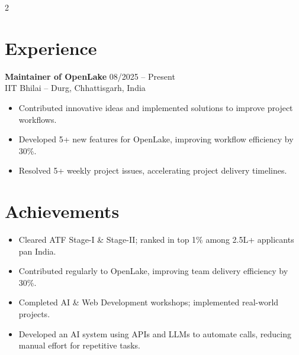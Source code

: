 \documentclass[a4paper,11pt]{article}
\begin{document}
\begin{paracol}{2}
		\section*{Experience}
		\textbf{Maintainer of OpenLake} \hfill 08/2025 -- Present\\
		IIT Bhilai – Durg, Chhattisgarh, India
		\begin{itemize}
			\item Contributed innovative ideas and implemented solutions to improve project workflows.
			\item Developed 5+ new features for OpenLake, improving workflow efficiency by 30\%.  
			\item Resolved 5+ weekly project issues, accelerating project delivery timelines. 
		\end{itemize}
		
		\section*{Achievements}
		\begin{itemize}
			\item Cleared ATF Stage-I \& Stage-II; ranked in top 1\% among 2.5L+ applicants pan India.
			\item Contributed regularly to OpenLake, improving team delivery efficiency by 30\%.
			\item Completed AI \& Web Development workshops; implemented real-world projects.
			\item Developed an AI system using APIs and LLMs to automate calls, reducing manual effort for repetitive tasks.
		\end{itemize}
		
	\end{paracol}
\end{document}
